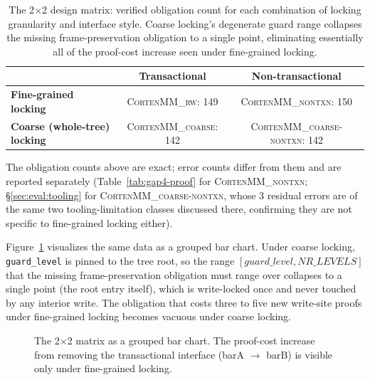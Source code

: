 \documentclass[10pt]{article}
\newcommand{\corten}[1]{\textsc{CortenMM\_#1}}
\begin{document}
\begin{table}[h]
\centering
\caption{The 2$\times$2 design matrix: verified obligation count for
each combination of locking granularity and interface style.
Coarse locking's degenerate guard range collapses the missing
frame-preservation obligation to a single point, eliminating essentially
all of the proof-cost increase seen under fine-grained locking.}
\label{tab:matrix}
\begin{tabular}{@{}lcc@{}}
\toprule
 & \textbf{Transactional} & \textbf{Non-transactional} \\
\midrule
\textbf{Fine-grained locking} & \corten{rw}: 149 & \corten{nontxn}: 150 \\
\textbf{Coarse (whole-tree) locking} & \corten{coarse}: 142 & \corten{coarse-nontxn}: 142 \\
\bottomrule
\end{tabular}
\end{table}

The obligation counts above are exact; error counts differ from them
and are reported separately (Table~\ref{tab:gap4-proof} for
\corten{nontxn}; \S\ref{sec:eval:tooling} for \corten{coarse-nontxn},
whose 3 residual errors are of the same two tooling-limitation classes
discussed there, confirming they are not specific to fine-grained
locking either).

Figure~\ref{fig:matrix} visualizes the same data as a grouped bar chart.
Under coarse locking, \texttt{guard\_level} is pinned to the tree root,
so the range $[\mathit{guard\_level}, \mathit{NR\_LEVELS}]$ that the
missing frame-preservation obligation must range over collapses to a
single point (the root entry itself), which is write-locked once and
never touched by any interior write. The obligation that costs three to
five new write-site proofs under fine-grained locking becomes vacuous
under coarse locking.

\begin{figure}[h]
\centering
{}
\caption{The 2$\times$2 matrix as a grouped bar chart. The
proof-cost increase from removing the transactional interface
(barA $\to$ barB) is visible only under fine-grained locking.}
\label{fig:matrix}
\end{figure}
\end{document}
